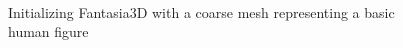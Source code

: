 \begin{figure}[ht]
\begin{subfigure}[b]{0.37\textwidth}
        \caption{}
    \end{subfigure}
    \caption{Initializing Fantasia3D with a coarse mesh representing a basic human figure}~\label{fig:generationFantasia2}
\end{figure}